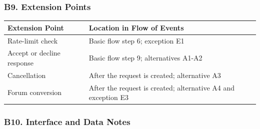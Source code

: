\documentclass[12pt]{article}
\renewcommand{\baselinestretch}{1.5}
\begin{document}
\hypertarget{sec:b9-extension-points}{}
\subsubsection*{B9. Extension Points}
\par\medskip

\begingroup
\small
\renewcommand{\baselinestretch}{1.0}\selectfont
\renewcommand{\arraystretch}{1.15}
\setlength{\tabcolsep}{6pt}
\begin{longtable}{|>{\raggedright\arraybackslash}p{}|>{\raggedright\arraybackslash}p{}|}
\hline
\textbf{Extension Point} & \textbf{Location in Flow of Events} \\ \hline
\endhead
Rate-limit check & Basic flow step 6; exception E1 \\ \hline
Accept or decline response & Basic flow step 9; alternatives A1-A2 \\ \hline
Cancellation & After the request is created; alternative A3 \\ \hline
Forum conversion & After the request is created; alternative A4 and exception E3 \\ \hline
\end{longtable}
\endgroup
\par\medskip

\hypertarget{sec:b10-interface-and-data-notes}{}
\subsubsection*{B10. Interface and Data Notes}
\par\medskip
\end{document}
